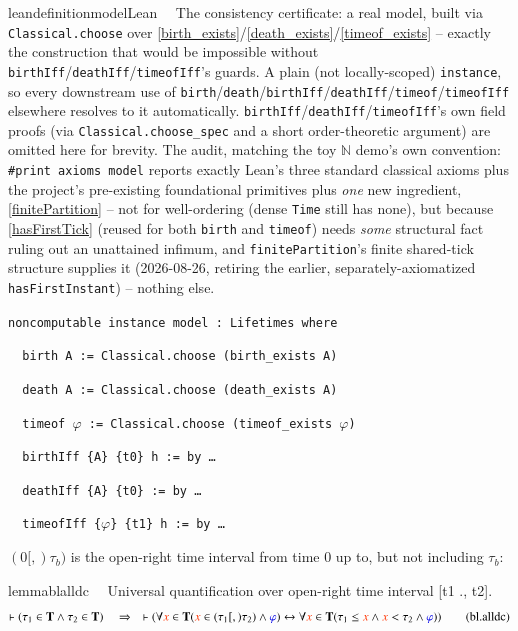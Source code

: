 \begin{restatable}{leandefinition}{modelLean}~~ The consistency certificate: a real model,
built via \texttt{Classical.choose} over \ref{birth_exists}/\ref{death_exists}/\ref{timeof_exists} -- exactly
the construction that would be impossible without \texttt{birthIff}/\texttt{deathIff}/\texttt{timeofIff}'s
guards. A plain (not locally-scoped) \texttt{instance}, so every downstream use of
\texttt{birth}/\texttt{death}/\texttt{birthIff}/\texttt{deathIff}/\texttt{timeof}/\texttt{timeofIff} elsewhere
resolves to it automatically. \texttt{birthIff}/\texttt{deathIff}/\texttt{timeofIff}'s own field proofs (via
\texttt{Classical.choose\_spec} and a short order-theoretic argument) are omitted here for brevity. The audit,
matching the toy \texttt{$\mathbb{N}$} demo's own convention: \texttt{\#print axioms model} reports exactly
Lean's three standard classical axioms plus the project's pre-existing foundational primitives plus
\emph{one} new ingredient, \ref{finitePartition} -- not for well-ordering (dense \texttt{Time} still has none),
but because \ref{hasFirstTick} (reused for both \texttt{birth} and \texttt{timeof}) needs \emph{some}
structural fact ruling out an unattained infimum, and \texttt{finitePartition}'s finite shared-tick structure
supplies it (2026-08-26, retiring the earlier, separately-axiomatized \texttt{hasFirstInstant}) -- nothing
else.

\texttt{\textcolor{leancolor}{noncomputable instance} \textcolor{leanyellow}{model} : Lifetimes \textcolor{leancolor}{where}}

\texttt{~~birth A := Classical.choose (birth\_exists A)}

\texttt{~~death A := Classical.choose (death\_exists A)}

\texttt{~~timeof $\varphi$ := Classical.choose (timeof\_exists $\varphi$)}

\texttt{~~birthIff \{A\} \{t0\} h := \textcolor{leancolor}{by} \ldots}

\texttt{~~deathIff \{A\} \{t0\} := \textcolor{leancolor}{by} \ldots}

\texttt{~~timeofIff \{$\varphi$\} \{t1\} h := \textcolor{leancolor}{by} \ldots}
\label{model}
\end{restatable}

\pn $(0[,)\tau_b)$ is the open-right time interval from time 0 up to, but not including $\tau_b$:

\begin{restatable}{lemma}{blalldc}~~ Universal quantification over open-right
time interval [t1 ., t2].
\begin{align}
\vdash ( \tau_1 \in \mathbf{T} \wedge \tau_2 \in \mathbf{T}
    )\quad\Rightarrow\quad \vdash ( \forall \msc{x} \in \mathbf{T} ( \msc{x}
    \in ( \tau_1 [,) \tau_2 ) \wedge \mw{\varphi} ) \leftrightarrow \forall
    \msc{x} \in \mathbf{T} ( \tau_1 \le \msc{x} \wedge \msc{x} < \tau_2 \wedge
    \mw{\varphi} ) )\label{eq:bl.alldc}\tag{bl.alldc}
\end{align}
\end{restatable}

